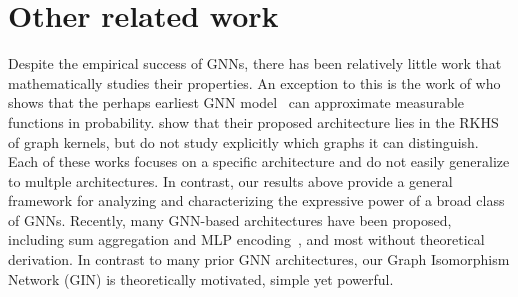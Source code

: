 \section{Other related work}
\label{sec:related}
Despite the empirical success of GNNs, there has been relatively little work that mathematically studies their properties.  An exception to this is the work of \citet{scarselli2009computational} who shows that the perhaps earliest GNN model~\citep{scarselli2009graph} can approximate measurable functions in probability. \citet{lei2017deriving} show that their proposed architecture lies in the RKHS of graph kernels, but do not study explicitly which graphs it can distinguish. Each of these works focuses on a specific architecture and do not easily generalize to multple architectures. %
In contrast, our results above provide a general framework for analyzing and characterizing the expressive power of a broad class of GNNs. 
Recently, many GNN-based architectures have been proposed, including sum aggregation and MLP encoding~\citep{battaglia2016interaction, scarselli2009graph,  duvenaud2015convolutional}, and most without theoretical derivation. In contrast to many prior GNN architectures, our Graph Isomorphism Network (GIN) is theoretically motivated, simple yet powerful.

